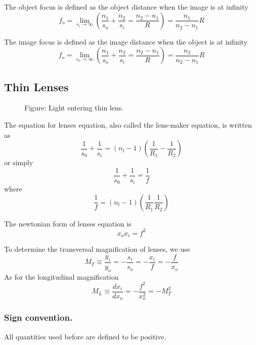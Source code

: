 \documentclass[../../../main.tex]{subfiles}
\begin{document}
The object focus is defined as the object distance when the image is at infinity
\begin{equation*}
    f_o=\lim_{s_i\rightarrow\infty}\left(\frac{n_1}{s_o}+\frac{n_2}{s_i}=\frac{n_2-n_1}{R}\right)=\frac{n_1}{n_2-n_1}R
\end{equation*}

The image focus is defined as the image distance when the object is at infinity
\begin{equation*}
    f_o=\lim_{s_o\rightarrow\infty}\left(\frac{n_1}{s_o}+\frac{n_2}{s_i}=\frac{n_2-n_1}{R}\right)=\frac{n_2}{n_2-n_1}R
\end{equation*}

\subsection*{Thin Lenses}
\begin{figure}
    \centering
    \caption*{Figure: Light entering thin lens.}
\end{figure}
The equation for lenses equation, also called the lens-maker equation, is written as 
\begin{equation*}
    \frac{1}{s_0}+\frac{1}{s_i}=(n_l-1)\left(\frac{1}{R_1}-\frac{1}{R_2}\right)
\end{equation*}
or simply
\begin{equation*}
    \frac{1}{s_0}+\frac{1}{s_i}=\frac{1}{f}
\end{equation*}
where
\begin{equation*}
    \frac{1}{f}=(n_l-1)\left(\frac{1}{R_1}\frac{1}{R_2}\right)
\end{equation*}

The newtonian form of lenses equation is 
\begin{equation*}
    x_ox_i=f^2
\end{equation*}

To determine the transversal magnification of lenses, we use 
\begin{equation*}
    M_T\equiv \frac{y_i}{y_o}=-\frac{s_i}{s_o}=-\frac{x_i}{f}=-\frac{f}{x_o}
\end{equation*}
As for the longitudinal magnification
\begin{equation*}
    M_L\equiv \frac{dx_i}{dx_o}=-\frac{f^2}{x_o^2}=-M_T^2
\end{equation*}

\subsubsection*{Sign convention.} All quantities used before are defined to be positive.
\end{document}
